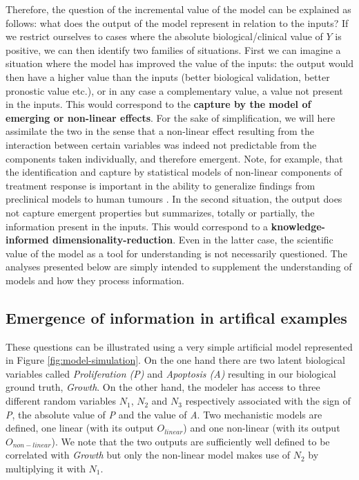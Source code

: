\documentclass[a4paper,12pt,twoside,onecolumn,openright,final,oldfontcommands]{memoir}
\begin{document}
Therefore, the question of the incremental value of the model can be
explained as follows: what does the output of the model represent in
relation to the inputs? If we restrict ourselves to cases where the
absolute biological/clinical value of \(Y\) is positive, we can then
identify two families of situations. First we can imagine a situation
where the model has improved the value of the inputs: the output would
then have a higher value than the inputs (better biological validation,
better pronostic value etc.), or in any case a complementary value, a
value not present in the inputs. This would correspond to the
\textbf{capture by the model of emerging or non-linear effects}. For the
sake of simplification, we will here assimilate the two in the sense
that a non-linear effect resulting from the interaction between certain
variables was indeed not predictable from the components taken
individually, and therefore emergent. Note, for example, that the
identification and capture by statistical models of non-linear
components of treatment response is important in the ability to
generalize findings from preclinical models to human tumours
\citep{mourragui2020precise}. In the second situation, the output does
not capture emergent properties but summarizes, totally or partially,
the information present in the inputs. This would correspond to a
\textbf{knowledge-informed dimensionality-reduction}. Even in the latter
case, the scientific value of the model as a tool for understanding is
not necessarily questioned. The analyses presented below are simply
intended to supplement the understanding of models and how they process
information.

\subsection{Emergence of information in artifical
examples}\label{emergence-of-information-in-artifical-examples}

These questions can be illustrated using a very simple artificial model
represented in Figure \ref{fig:model-simulation}. On the one hand there
are two latent biological variables called \emph{Proliferation (P)} and
\emph{Apoptosis (A)} resulting in our biological ground truth,
\emph{Growth}. On the other hand, the modeler has access to three
different random variables \(N_1\), \(N_2\) and \(N_3\) respectively
associated with the sign of \emph{P}, the absolute value of \emph{P} and
the value of \emph{A}. Two mechanistic models are defined, one linear
(with its output \(O_{linear}\)) and one non-linear (with its output
\(O_{non-linear}\)). We note that the two outputs are sufficiently well
defined to be correlated with \emph{Growth} but only the non-linear
model makes use of \(N_2\) by multiplying it with \(N_1\).
\end{document}
